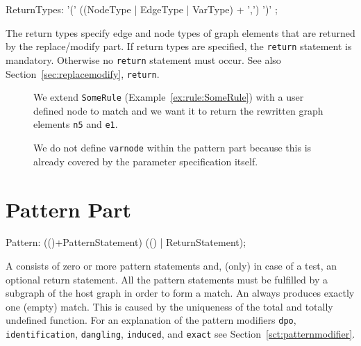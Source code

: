 \begin{rail}
  ReturnTypes: '(' ((NodeType | EdgeType | VarType) + ',') ')' ;
\end{rail}
The return types specify edge and node types of graph elements that are returned by the replace/modify part.
If return types are specified, the \texttt{return} statement is mandatory.
Otherwise no \texttt{return} statement must occur. See also Section~\ref{sec:replacemodify}, \texttt{return}.

\begin{figure}[htbp]
\begin{example}\label{ex:rule:someruleext}
We extend \texttt{SomeRule} (Example~\ref{ex:rule:SomeRule}) with a user defined node to match and we want it to return the rewritten graph elements \texttt{n5} and \texttt{e1}.
\begin{grgen}
  rule SomeRuleExt(varnode:Node):(Node, EdgeTypeB) {
    n1:NodeTypeA;
    ...

    replace {
      varnode;
      ...
      return(n5, e1);
      eval {
        ...
\end{grgen}
We do not define \texttt{varnode} within the pattern part because this is already covered by the parameter specification itself.
\end{example}
\end{figure}


\section{Pattern Part}
\label{patternpart}
\begin{rail}
  Pattern: (()+PatternStatement) (() | ReturnStatement);
\end{rail}
A  consists of zero or more pattern statements and, (only) in case of a test, an optional return statement.
All the pattern statements must be fulfilled by a subgraph of the host graph in order to form a match.
An  always produces exactly one (empty) match.
This is caused by the uniqueness of the total and totally undefined function.
For an explanation of the pattern modifiers \texttt{dpo}, \texttt{identification}, \texttt{dangling}, \texttt{induced}, and \texttt{exact} see Section~\ref{sct:patternmodifier}.

